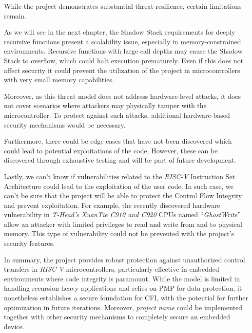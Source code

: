 While the project demonstrates substantial threat resilience, certain
limitations remain.

As we will see in the next chapter, the Shadow Stack requirements for deeply recursive
functions present a scalability issue, especially in memory-constrained
environments. Recursive functions with large call depths may cause the Shadow Stack
to overflow, which could halt execution prematurely. Even if this does not affect
security it could prevent the utilization of the project in microcontrollers with
very small memory capabilities.

Moreover, as this threat model does not address hardware-level attacks, it does not
cover scenarios where attackers may physically tamper with the microcontroller.
To protect against such attacks, additional hardware-based security mechanisms would
be necessary.

Furthermore, there could be edge cases that have not been discovered which could
lead to potential exploitations of the code. However, these can be discovered
through exhaustive testing and will be part of future development.

Lastly, we can't know if vulnerabilities related to the \textit{RISC-V}
Instruction Set Architecture could lead to the exploitation of the user code. In
such case, we can't be sure that the project will be able to protect the Control
Flow Integrity and prevent exploitation. For example, the recently discovered
hardware vulnerability in \textit{T-Head's XuanTie C910 and C920} CPUs named ``\textit{GhostWrite}''
\cite{riscvuzz} allow an attacker with limited privileges to read and write from
and to physical memory. This type of vulnerability could not be prevented with the
project's security features.

In summary, the project provides robust protection against unauthorized control
transfers in \textit{RISC-V} microcontrollers, particularly effective in
embedded environments where code integrity is paramount. While the model is limited
in handling recursion-heavy applications and relies on PMP for data protection,
it nonetheless establishes a secure foundation for CFI, with the potential for further
optimization in future iterations. Moreover, \textit{project name} could be
implemented together with other security mechanisms to completely secure an
embedded device.